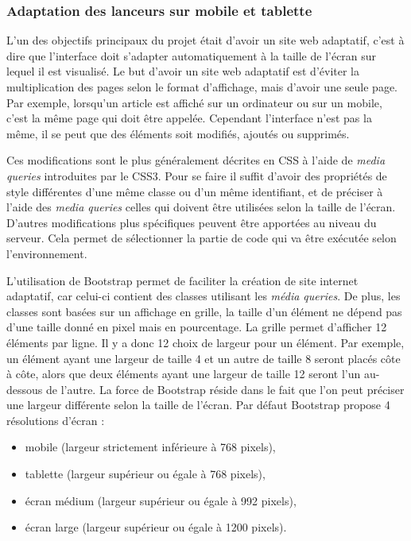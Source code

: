 \documentclass[12pt,a4paper]{article}
\begin{document}
\subsubsection{Adaptation des lanceurs sur mobile et tablette}
L'un des objectifs principaux du projet était d'avoir un site web adaptatif, c'est à dire que l'interface doit s'adapter automatiquement à la taille de l'écran sur lequel il est visualisé. Le but d'avoir un site web adaptatif est d'éviter la multiplication des pages selon le format d'affichage, mais d'avoir une seule page. Par exemple, lorsqu'un article est affiché sur un ordinateur ou sur un mobile, c'est la même page qui doit être appelée. Cependant l'interface n'est pas la même, il se peut que des éléments soit modifiés, ajoutés ou supprimés.\par 
Ces modifications sont le plus généralement décrites en \gls{CSS} à l'aide de \textit{media queries} introduites par le \gls{CSS}3. Pour se faire il suffit d'avoir des propriétés de style différentes d'une même classe ou d'un même identifiant, et de préciser à l'aide des \textit{media queries} celles qui doivent être utilisées selon la taille de l'écran. D'autres modifications plus spécifiques peuvent être apportées au niveau du serveur. Cela permet de sélectionner la partie de code qui va être exécutée selon l'environnement.\par
\medskip
L'utilisation de Bootstrap permet de faciliter la création de site internet adaptatif, car celui-ci contient des classes utilisant les \textit{média queries}. De plus, les classes sont basées sur un affichage en grille, la taille d'un élément ne dépend pas d'une taille donné en pixel mais en pourcentage. La grille permet d'afficher 12 éléments par ligne. Il y a donc 12 choix de largeur pour un élément. Par exemple, un élément ayant une largeur de taille 4 et un autre de taille 8 seront placés côte à côte, alors que deux éléments ayant une largeur de taille 12 seront l'un au-dessous de l'autre. La force de Bootstrap réside dans le fait que l'on peut préciser une largeur différente selon la taille de l'écran. Par défaut Bootstrap propose 4 résolutions d'écran :
\begin{itemize}
\item mobile (largeur strictement inférieure à 768 pixels),
\item tablette (largeur supérieur ou égale à 768 pixels),
\item écran médium (largeur supérieur ou égale à 992 pixels),
\item écran large (largeur supérieur ou égale à 1200 pixels).
\end{itemize}
\end{document}
